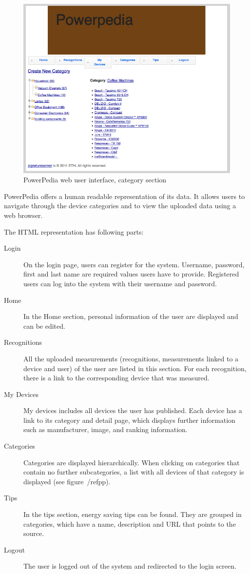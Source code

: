 \begin{figure}[htbp]
\begin{center}
\includegraphics[width=13cm]{Images/pp.png}
\caption{PowerPedia web user interface, category section}
\label{pp}
\end{center}
\end{figure} 
PowerPedia offers a human readable representation of its data. It allows users to navigate through the device categories and to view the uploaded data using a web browser.

The HTML representation has following parts:
\begin{description}
\item[Login] On the login page, users can register for the system. Username, password, first and last name are required values users have to provide. Registered users can log into the system with their username and password. 
\item[Home] In the Home section, personal information of the user are displayed and can be edited. 
\item[Recognitions] All the uploaded measurements (recognitions, measurements linked to a device and user) of the user are listed in this section. For each recognition, there is a link to the corresponding device that was measured.
\item[My Devices] My devices includes all devices the user has published. Each device has a link to its category and detail page, which displays further information such as manufacturer, image, and ranking information.
\item[Categories] Categories are displayed hierarchically. When clicking on categories that contain no further subcategories, a list with all devices of that category is displayed (see figure~/ref{pp}). 
\item[Tips] In the tips section, energy saving tips can be found. They are grouped in categories, which have a name, description and URL that points to the source. 
\item[Logout] The user is logged out of the system and redirected to the login screen.
\end{description}

